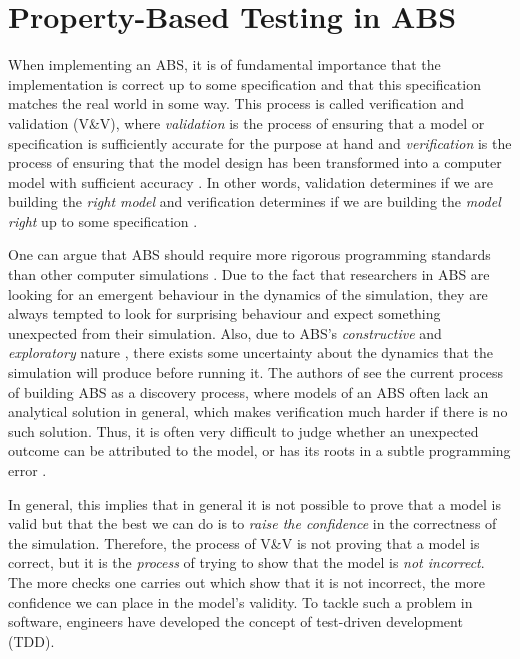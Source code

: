 \chapter{Property-Based Testing in ABS}
\label{ch:property}

When implementing an ABS, it is of fundamental importance that the implementation is correct up to some specification and that this specification matches the real world in some way. This process is called verification and validation (V\&V), where \textit{validation} is the process of ensuring that a model or specification is sufficiently accurate for the purpose at hand and \textit{verification} is the process of ensuring that the model design has been transformed into a computer model with sufficient accuracy \cite{robinson_simulation:_2014}. In other words, validation determines if we are building the \textit{right model} and verification determines if we are building the \textit{model right} up to some specification \cite{balci_verification_1998}.

One can argue that ABS should require more rigorous programming standards than other computer simulations \cite{polhill_ghost_2005}. Due to the fact that researchers in ABS are looking for an emergent behaviour in the dynamics of the simulation, they are always tempted to look for surprising behaviour and expect something unexpected from their simulation. 
Also, due to ABS's \textit{constructive} and \textit{exploratory} nature \cite{epstein_chapter_2006, epstein_generative_2012}, there exists some uncertainty about the dynamics that the simulation will produce before running it. The authors of \cite{ormerod_validation_2006} see the current process of building ABS as a discovery process, where models of an ABS often lack an analytical solution in general, which makes verification much harder if there is no such solution. Thus, it is often very difficult to judge whether an unexpected outcome can be attributed to the model, or has its roots in a subtle programming error \cite{galan_errors_2009}.

In general, this implies that in general it is not possible to prove that a model is valid but that the best we can do is to \textit{raise the confidence} in the correctness of the simulation. Therefore, the process of V\&V is not proving that a model is correct, but it is the \textit{process} of trying to show that the model is \textit{not incorrect}. The more checks one carries out which show that it is not incorrect, the more confidence we can place in the model's validity. To tackle such a problem in software, engineers have developed the concept of test-driven development (TDD).


